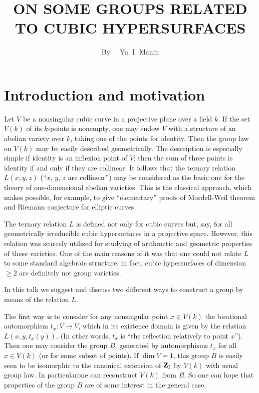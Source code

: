 \title{ON SOME GROUPS RELATED TO CUBIC HYPERSURFACES}

\author{By~~ Yu. I. Manin}

\date{}

\maketitle

\setcounter{pageoriginal}{254}
\section*{Introduction and motivation}
\pageoriginale

Let $V$ be a nonsingular cubic curve in a projective plane over a field $k$. If the set $V(k)$ of its $k$-points is nonempty, one may endow $V$ with a structure of an abelian variety over $k$, taking one of the points for identity. Then the group law on $V(k)$ may be easily described geometrically. The description is especially simple if identity is an inflexion point of $V$: then the sum of three points is identity if and only if they are collinear. It follows that the ternary relation $L(x,y,z)$ (``$x$, $y$, $z$ are collinear'') may be considered as the basic one for the theory of one-dimensional abelian varieties. This is the classical approach, which makes possible, for example, to give ``elementary'' proofs of Mordell-Weil theorem and Riemann conjecture for elliptic curves.

The ternary relation $L$ is defined not only for cubic curves but, say, for all geometrically irreducible cubic hypersurfaces in a projective space. However, this relation was scarcely utilized for studying of arithmetic and geometric properties of these varieties. One of the main reasons of it was that one could not relate $L$ to some standard algebraic structure: in fact, cubic hypersurfaces of dimension $\geq 2$ are definitely not group varieties.

In this talk we suggest and discuss two different ways to construct a group by means of the relation $L$.

The first way is to consider for any nonsingular point $x\in V(k)$ the birational automorphism $t_{x}:V\to V$, which in its existence domain is given by the relation $L(x,y,t_{x}(y))$. (In other words, $t_{x}$ is ``the reflection relatively to point $x$''). Then one may consider the group $B$, generated by automorphisms $t_{x}$ for all $x\in V(k)$ (or for some subset of points). If $\dim V=1$, this group $B$ is easily seen to be isomorphic to the canonical extension of $\mathbf{Z}_{2}$ by $V(k)$ with usual group law. In particular\pageoriginale one can reconstruct $V(k)$ from $B$. So one can hope that properties of the group $B$ are of some interest in the general case.

